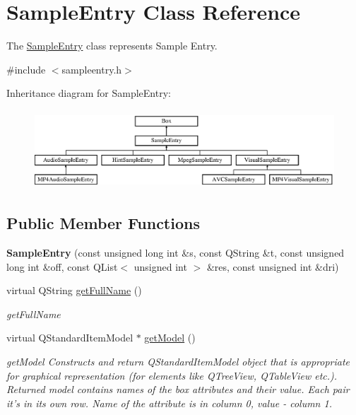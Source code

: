 \hypertarget{class_sample_entry}{\section{Sample\-Entry Class Reference}
\label{class_sample_entry}
}


The \hyperlink{class_sample_entry}{Sample\-Entry} class represents Sample Entry.  




{\ttfamily \#include $<$sampleentry.\-h$>$}

Inheritance diagram for Sample\-Entry\-:\begin{figure}[H]
\begin{center}
\leavevmode
\includegraphics[height=2.947368cm]{class_sample_entry}
\end{center}
\end{figure}
\subsection*{Public Member Functions}
\begin{DoxyCompactItemize}
\item 
\hypertarget{class_sample_entry_a2f53bd89f6774f6b2b6b9e6cf16ee07c}{{\bfseries Sample\-Entry} (const unsigned long int \&s, const Q\-String \&t, const unsigned long int \&off, const Q\-List$<$ unsigned int $>$ \&res, const unsigned int \&dri)}\label{class_sample_entry_a2f53bd89f6774f6b2b6b9e6cf16ee07c}

\item 
virtual Q\-String \hyperlink{class_sample_entry_acbc7081715759b868797ad71b469a63e}{get\-Full\-Name} ()
\begin{DoxyCompactList}\small\item\em get\-Full\-Name \end{DoxyCompactList}\item 
virtual Q\-Standard\-Item\-Model $\ast$ \hyperlink{class_sample_entry_a0babc6ec796f6bf05a5e3e59d635ca79}{get\-Model} ()
\begin{DoxyCompactList}\small\item\em get\-Model Constructs and return Q\-Standard\-Item\-Model object that is appropriate for graphical representation (for elements like Q\-Tree\-View, Q\-Table\-View etc.). Returned model contains names of the box attributes and their value. Each pair it's in its own row. Name of the attribute is in column 0, value -\/ column 1. \end{DoxyCompactList}\end{DoxyCompactItemize}
